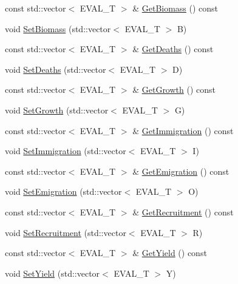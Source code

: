 \begin{DoxyCompactItemize}
\item 
const std\+::vector$<$ E\+V\+A\+L\+\_\+\+T $>$ \& \hyperlink{classmas_1_1_subpopulation_aa87c3373a861eba296a69fe3e657565c}{Get\+Biomass} () const 
\item 
void \hyperlink{classmas_1_1_subpopulation_a6996bcd59c1025b4f2f3920e9c68319b}{Set\+Biomass} (std\+::vector$<$ E\+V\+A\+L\+\_\+\+T $>$ B)
\item 
const std\+::vector$<$ E\+V\+A\+L\+\_\+\+T $>$ \& \hyperlink{classmas_1_1_subpopulation_a3c22a89350333d31b9ea53549a1ae10a}{Get\+Deaths} () const 
\item 
void \hyperlink{classmas_1_1_subpopulation_aaadc13ab0f279b17fc5d614c162bcadf}{Set\+Deaths} (std\+::vector$<$ E\+V\+A\+L\+\_\+\+T $>$ D)
\item 
const std\+::vector$<$ E\+V\+A\+L\+\_\+\+T $>$ \& \hyperlink{classmas_1_1_subpopulation_a911cb74fa693f227571c5b1f62056706}{Get\+Growth} () const 
\item 
void \hyperlink{classmas_1_1_subpopulation_a04e79b77bde878446da1d0865e1dfba7}{Set\+Growth} (std\+::vector$<$ E\+V\+A\+L\+\_\+\+T $>$ G)
\item 
const std\+::vector$<$ E\+V\+A\+L\+\_\+\+T $>$ \& \hyperlink{classmas_1_1_subpopulation_adbce04c7ef48a58c79e99b0bd3ca6c4c}{Get\+Immigration} () const 
\item 
void \hyperlink{classmas_1_1_subpopulation_ac4580adc5b36204cebf3dc0d0d635bc5}{Set\+Immigration} (std\+::vector$<$ E\+V\+A\+L\+\_\+\+T $>$ I)
\item 
const std\+::vector$<$ E\+V\+A\+L\+\_\+\+T $>$ \& \hyperlink{classmas_1_1_subpopulation_a4d05a146ce3c238c128b551cb5acc1b3}{Get\+Emigration} () const 
\item 
void \hyperlink{classmas_1_1_subpopulation_a20024405eb1301ae3b2ba09e5406a698}{Set\+Emigration} (std\+::vector$<$ E\+V\+A\+L\+\_\+\+T $>$ O)
\item 
const std\+::vector$<$ E\+V\+A\+L\+\_\+\+T $>$ \& \hyperlink{classmas_1_1_subpopulation_af26cae85fc81a9ec8798681da0379e46}{Get\+Recruitment} () const 
\item 
void \hyperlink{classmas_1_1_subpopulation_aeac612138675364dc13972262f2a3ead}{Set\+Recruitment} (std\+::vector$<$ E\+V\+A\+L\+\_\+\+T $>$ R)
\item 
const std\+::vector$<$ E\+V\+A\+L\+\_\+\+T $>$ \& \hyperlink{classmas_1_1_subpopulation_ade5c7a93d11b9be501bfbe9d7870b2af}{Get\+Yield} () const 
\item 
void \hyperlink{classmas_1_1_subpopulation_a5dcedd8e261c53760d1999513e773461}{Set\+Yield} (std\+::vector$<$ E\+V\+A\+L\+\_\+\+T $>$ Y)

\end{DoxyCompactItemize}
